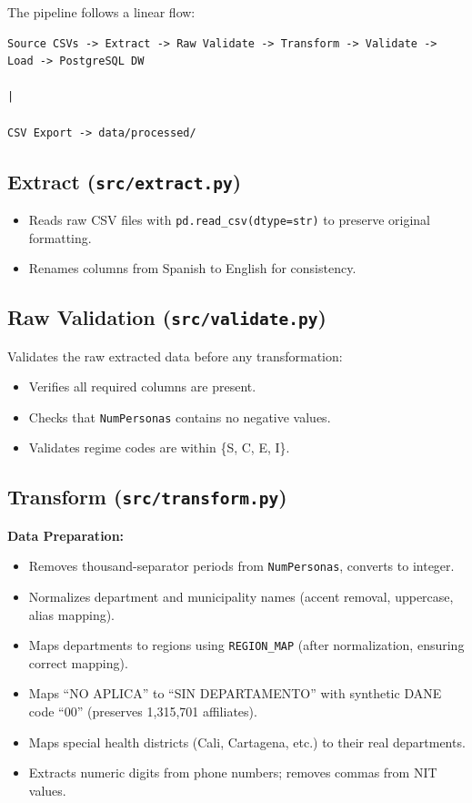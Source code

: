 \documentclass[12pt,a4paper]{article}
\begin{document}
The pipeline follows a linear flow:

\begin{lstlisting}
Source CSVs -> Extract -> Raw Validate -> Transform -> Validate -> Load -> PostgreSQL DW
                                                                            |
                                                                      CSV Export -> data/processed/
\end{lstlisting}

\subsection{Extract (\texttt{src/extract.py})}

\begin{itemize}[nosep]
    \item Reads raw CSV files with \texttt{pd.read\_csv(dtype=str)} to preserve original formatting.
    \item Renames columns from Spanish to English for consistency.
\end{itemize}

\subsection{Raw Validation (\texttt{src/validate.py})}

Validates the raw extracted data before any transformation:
\begin{itemize}[nosep]
    \item Verifies all required columns are present.
    \item Checks that \texttt{NumPersonas} contains no negative values.
    \item Validates regime codes are within \{S, C, E, I\}.
\end{itemize}

\subsection{Transform (\texttt{src/transform.py})}

\textbf{Data Preparation:}
\begin{itemize}[nosep]
    \item Removes thousand-separator periods from \texttt{NumPersonas}, converts to integer.
    \item Normalizes department and municipality names (accent removal, uppercase, alias mapping).
    \item Maps departments to regions using \texttt{REGION\_MAP} (after normalization, ensuring correct mapping).
    \item Maps ``NO APLICA'' to ``SIN DEPARTAMENTO'' with synthetic DANE code ``00'' (preserves 1,315,701 affiliates).
    \item Maps special health districts (Cali, Cartagena, etc.) to their real departments.
    \item Extracts numeric digits from phone numbers; removes commas from NIT values.
\end{itemize}
\end{document}
